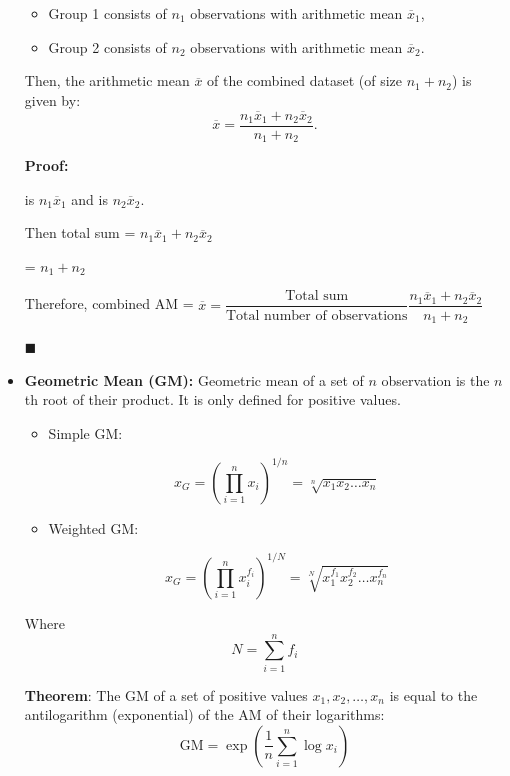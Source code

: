 \documentclass[twoside]{book}
\begin{document}
\begin{itemize}
\begin{textbox}
\begin{itemize}
  \item Group 1 consists of \( n_1 \) observations with arithmetic mean \( \overline{x}_1 \),
  \item Group 2 consists of \( n_2 \) observations with arithmetic mean \( \overline{x}_2 \).
\end{itemize}

Then, the arithmetic mean \( \overline{x} \) of the combined dataset (of size \( n_1 + n_2 \)) is given by:
\[
\overline{x} = \dfrac{n_1 \overline{x}_1 + n_2 \overline{x}_2}{n_1 + n_2}.
\]
\end{textbox}

\textbf{Proof:}

 is $n_1 \overline{x}_1$ and  is $n_2 \overline{x}_2$.

Then total sum = $n_1 \overline{x}_1 + n_2 \overline{x}_2$

 = $n_1 + n_2$

Therefore, combined AM = $\overline{x} = \dfrac{\text{Total sum}}{\text{Total number of observations}} \dfrac{n_1 \overline{x}_1 + n_2 \overline{x}_2}{n_1 + n_2}$

\hfill $\blacksquare$

    \item \textbf{Geometric Mean (GM):} Geometric mean of a set of $n$ observation is the $n$th root of their product. It is only defined for positive values.

    \begin{itemize}
        \item Simple GM:
        \begin{textbox}
    \[
    x_G = \left( \prod_{i=1}^{n} x_i \right)^{1/n} = \sqrt[n]{x_1 x_2 \dots x_n}
    \]
    \end{textbox}
    \item Weighted GM:
    \begin{textbox}
    \[
    x_G = \left( \prod_{i=1}^{n} x_i^{f_i} \right)^{1/N} = \sqrt[N]{x_1^{f_1} x_2^{f_2} \dots x_n^{f_n}}
    \]
    \end{textbox}
    \end{itemize}
    Where $$N = \sum_{i=1}^n f_i$$

        \begin{textbox}
        \textbf{Theorem}: The GM of a set of positive values \( x_1, x_2, \dots, x_n \) is equal to the antilogarithm (exponential) of the AM of their logarithms:
\[
\mathrm{GM} = \exp\left( \frac{1}{n} \sum_{i=1}^n \log x_i \right)
\]
    \end{textbox}


\end{itemize}
\end{document}
